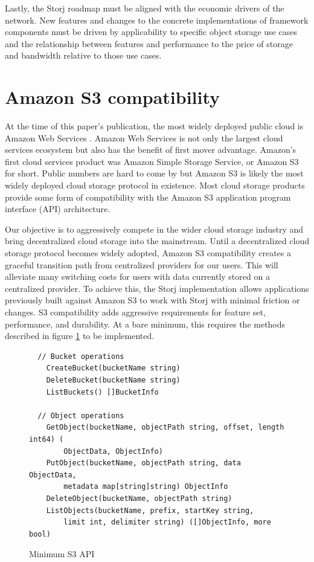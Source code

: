 \documentclass[8pt,fleqn,openany]{book}
\begin{document}
Lastly, the Storj roadmap must be aligned with the economic drivers of the
network.
New features and changes to the concrete implementations of framework
components must be driven by applicability to specific object storage use cases
and the relationship between features and performance to the price of storage
and bandwidth relative to those use cases.

\section{Amazon S3 compatibility}\label{constraint-amazon}

At the time of this paper's publication, the most widely deployed public cloud
is Amazon Web Services \cite{aws-dominates}. Amazon Web Services is not only
the largest cloud services ecosystem but also has the benefit of first mover
advantage. Amazon's first cloud services product was Amazon Simple Storage
Service, or Amazon S3 for short. Public numbers are hard to come by but
Amazon S3 is likely the most widely deployed cloud storage protocol in existence.
Most cloud storage products provide some form of compatibility with the
Amazon S3 application program interface (API) architecture.

Our objective is to aggressively compete in the wider cloud
storage industry and bring decentralized cloud storage into the mainstream.
Until a decentralized cloud storage protocol becomes widely adopted,
Amazon S3 compatibility creates a graceful transition path from centralized
providers for our users.
This will alleviate many switching costs for users with data currently stored on
a centralized provider.
To achieve this, the Storj implementation allows
applications previously built against Amazon S3 to work with Storj with
minimal friction or changes.
S3 compatibility adds aggressive requirements for feature set, performance, and
durability.
At a bare minimum, this requires the methods described in
figure \ref{fig:s3-api-code} to be implemented.

\begin{figure}[!htbp]
\lstset{language=Golang}
\begin{lstlisting}
  // Bucket operations
	CreateBucket(bucketName string)
	DeleteBucket(bucketName string)
	ListBuckets() []BucketInfo

  // Object operations
	GetObject(bucketName, objectPath string, offset, length int64) (
	    ObjectData, ObjectInfo)
	PutObject(bucketName, objectPath string, data ObjectData,
	    metadata map[string]string) ObjectInfo
	DeleteObject(bucketName, objectPath string)
	ListObjects(bucketName, prefix, startKey string,
	    limit int, delimiter string) ([]ObjectInfo, more bool)
\end{lstlisting}
\caption{Minimum S3 API}
\label{fig:s3-api-code}
\end{figure}
\end{document}
